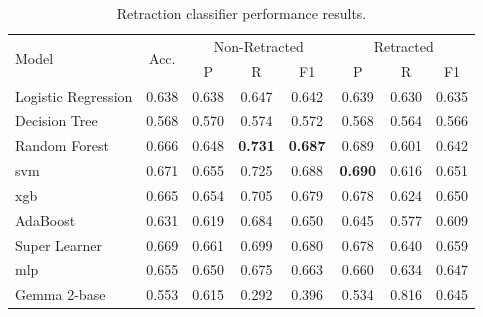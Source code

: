 \documentclass[pdflatex,sn-mathphys-num]{sn-jnl}
\begin{document}
\begin{table}[htbp]
	\caption{Retraction classifier performance results.}\label{tab:classifier-scores-new}
	\small
	\begin{tabular}{l*{7}{c}}
		\toprule
		\multirow{2}{*}{Model}    & \multirow{2}{*}{Acc.} & \multicolumn{3}{c}{Non-Retracted} & \multicolumn{3}{c}{Retracted}                                                                     \\
		\cmidrule(lr){3-5} \cmidrule(lr){6-8}
		                          &                       & P                                 & R                             & F1             & P              & R              & F1             \\
		\midrule
		Logistic Regression       & 0.638                 & 0.638                             & 0.647                         & 0.642          & 0.639          & 0.630          & 0.635          \\
		Decision Tree             & 0.568                 & 0.570                             & 0.574                         & 0.572          & 0.568          & 0.564          & 0.566          \\
		Random Forest             & 0.666                 & 0.648                             & \textbf {0.731}               & \textbf{0.687} & 0.689          & 0.601          & 0.642          \\
		\gls*{svm}                & 0.671                 & 0.655                             & 0.725                         & 0.688          & \textbf{0.690} & 0.616          & 0.651          \\
		\gls*{xgb}                & 0.665                 & 0.654                             & 0.705                         & 0.679          & 0.678          & 0.624          & 0.650          \\
		AdaBoost                  & 0.631                 & 0.619                             & 0.684                         & 0.650          & 0.645          & 0.577          & 0.609          \\
		Super Learner             & 0.669                 & 0.661                             & 0.699                         & 0.680          & 0.678          & 0.640          & 0.659          \\
		\gls*{mlp}                & 0.655                 & 0.650                             & 0.675                         & 0.663          & 0.660          & 0.634          & 0.647          \\
		Gemma 2-base              & 0.553                 & 0.615                             & 0.292                         & 0.396          & 0.534          & 0.816          & 0.645          \\

\end{tabular}
\end{table}
\end{document}
